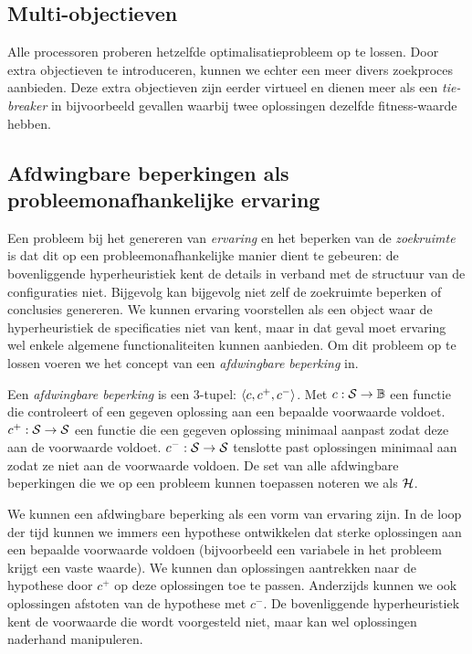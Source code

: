\subsection{Multi-objectieven}
Alle processoren proberen hetzelfde optimalisatieprobleem op te lossen. Door extra objectieven te introduceren, kunnen we echter een meer divers zoekproces aanbieden. Deze extra objectieven zijn eerder virtueel en dienen meer als een \emph{tie-breaker} in bijvoorbeeld gevallen waarbij twee oplossingen dezelfde fitness-waarde hebben.

\subsection{Afdwingbare beperkingen als probleemonafhankelijke ervaring}

Een probleem bij het genereren van \emph{ervaring} en het beperken van de \emph{zoekruimte} is dat dit op een probleemonafhankelijke manier dient te gebeuren: de bovenliggende hyperheuristiek kent de details in verband met de structuur van de configuraties niet. Bijgevolg kan bijgevolg niet zelf de zoekruimte beperken of conclusies genereren. We kunnen ervaring voorstellen als een object waar de hyperheuristiek de specificaties niet van kent, maar in dat geval moet ervaring wel enkele algemene functionaliteiten kunnen aanbieden. Om dit probleem op te lossen voeren we het concept van een \emph{afdwingbare beperking} in.

\begin{definition}
Een \emph{afdwingbare beperking} is een 3-tupel: $\left\langle c,c^+,c^-\right\rangle$. Met $c:\mathcal{S}\rightarrow\mathbb{B}$ een functie die controleert of een gegeven oplossing aan een bepaalde voorwaarde voldoet. $c^+:\mathcal{S}\rightarrow\mathcal{S}$ een functie die een gegeven oplossing minimaal aanpast zodat deze aan de voorwaarde voldoet. $c^-:\mathcal{S}\rightarrow\mathcal{S}$ tenslotte past oplossingen minimaal aan zodat ze niet aan de voorwaarde voldoen. De set van alle afdwingbare beperkingen die we op een probleem kunnen toepassen noteren we als $\mathcal{H}$.
\end{definition}

We kunnen een afdwingbare beperking als een vorm van ervaring zijn. In de loop der tijd kunnen we immers een hypothese ontwikkelen dat sterke oplossingen aan een bepaalde voorwaarde voldoen (bijvoorbeeld een variabele in het probleem krijgt een vaste waarde). We kunnen dan oplossingen aantrekken naar de hypothese door $c^+$ op deze oplossingen toe te passen. Anderzijds kunnen we ook oplossingen afstoten van de hypothese met $c^-$. De bovenliggende hyperheuristiek kent de voorwaarde die wordt voorgesteld niet, maar kan wel oplossingen naderhand manipuleren.

